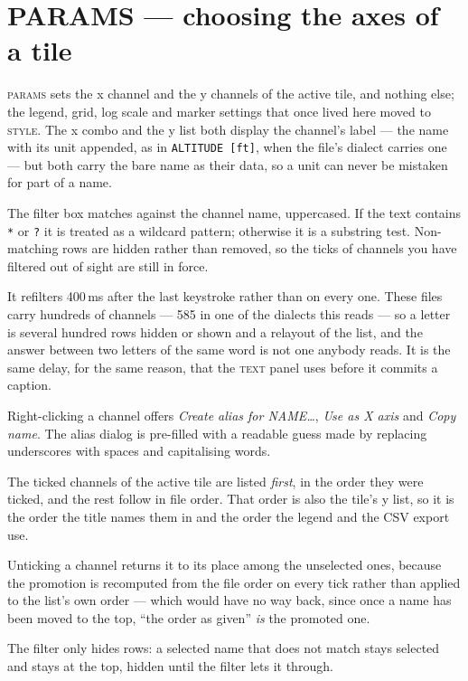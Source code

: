 \documentclass[11pt,a4paper,oneside]{report}
\newcommand{\code}[1]{\texttt{#1}}
\newcommand{\tab}[1]{\textsc{#1}}
\begin{document}
\section{PARAMS --- choosing the axes of a tile}
\label{sec:params}

\tab{params} sets the x channel and the y channels of the active tile, and
nothing else; the legend, grid, log scale and marker settings that once lived
here moved to \tab{style}. The x combo and the y list both display the channel's
label --- the name with its unit appended, as in \code{ALTITUDE [ft]}, when the
file's dialect carries one --- but both carry the bare name as their data, so a
unit can never be mistaken for part of a name.

The filter box matches against the channel name, uppercased. If the text
contains \code{*} or \code{?} it is treated as a wildcard pattern; otherwise it
is a substring test. Non-matching rows are hidden rather than removed, so the
ticks of channels you have filtered out of sight are still in force.

It refilters 400\,ms after the last keystroke rather than on every one. These
files carry hundreds of channels --- 585 in one of the dialects this reads ---
so a letter is several hundred rows hidden or shown and a relayout of the list,
and the answer between two letters of the same word is not one anybody reads.
It is the same delay, for the same reason, that the \tab{text} panel uses
before it commits a caption.

Right-clicking a channel offers \emph{Create alias for NAME\ldots}, \emph{Use as
X axis} and \emph{Copy name}. The alias dialog is pre-filled with a readable
guess made by replacing underscores with spaces and capitalising words.

The ticked channels of the active tile are listed \emph{first}, in the order
they were ticked, and the rest follow in file order. That order is also the
tile's y list, so it is the order the title names them in and the order the
legend and the CSV export use.

Unticking a channel returns it to its place among the unselected ones, because
the promotion is recomputed from the file order on every tick rather than
applied to the list's own order --- which would have no way back, since once a
name has been moved to the top, ``the order as given'' \emph{is} the promoted
one.

The filter only hides rows: a selected name that does not match stays selected
and stays at the top, hidden until the filter lets it through.
\end{document}
